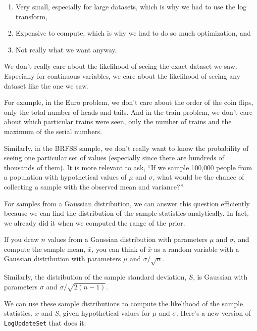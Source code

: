 \documentclass[12pt]{book}
\begin{document}
\begin{enumerate}

\item Very small, especially for large datasets, which is why we had
to use the log transform,

\item Expensive to compute, which is why we had to do so much
optimization, and

\item Not really what we want anyway.

\end{enumerate}

We don't really care about the likelihood of seeing the exact dataset
we saw.  Especially for continuous variables, we care about the
likelihood of seeing any dataset like the one we saw.

For example, in the Euro problem, we don't care about the order of
the coin flips, only the total number of heads and tails.  And in
the train problem, we don't care about which particular trains were
seen, only the number of trains and the maximum of the serial numbers.

Similarly, in the BRFSS sample, we don't really want to know the
probability of seeing one particular set of values (especially since
there are hundreds of thousands of them).  It is more
relevant to ask, ``If we sample 100,000 people from a population
with hypothetical values of $\mu$ and $\sigma$, what would be
the chance of collecting a sample with the observed mean and
variance?''

For samples from a Gaussian distribution, we can answer this question
efficiently because we can find the distribution of the sample
statistics analytically.  In fact, we already did it when we computed
the range of the prior.

If you draw $n$ values from a Gaussian distribution with parameters
$\mu$ and $\sigma$, and compute the sample mean, $\bar{x}$, you can
think of $\bar{x}$ as a random variable with a Gaussian distribution
with parameters $\mu$ and $\sigma / \sqrt{n}$.

Similarly, the distribution of the sample standard deviation, $S$, is
Gaussian with parameters $\sigma$ and $\sigma / \sqrt{2 (n-1)}$.

We can use these sample distributions to compute the likelihood of the
sample statistics, $\bar{x}$ and $S$, given hypothetical values
for $\mu$ and $\sigma$.  Here's a new version of \verb"LogUpdateSet"
that does it:
\end{document}
